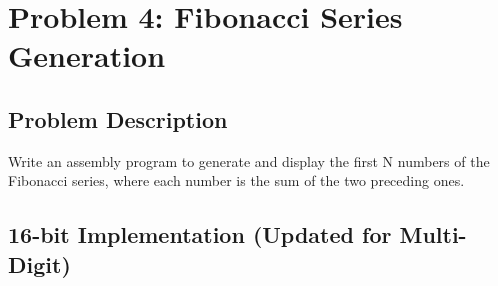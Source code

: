 \documentclass[12pt,a4paper]{article}
\begin{document}
\section{Problem 4: Fibonacci Series Generation}

\subsection{Problem Description}
Write an assembly program to generate and display the first N numbers of the Fibonacci series, where each number is the sum of the two preceding ones.

\subsection{16-bit Implementation (Updated for Multi-Digit)}
\end{document}
